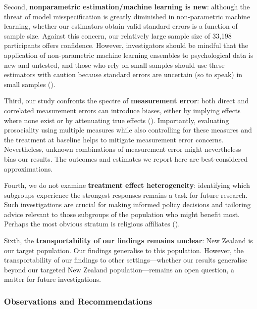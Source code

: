 \documentclass[
  single column]{article}
\begin{document}
Second, \textbf{nonparametric estimation/machine learning is new}:
although the threat of model misspecification is greatly diminished in
non-parametric machine learning, whether our estimators obtain valid
standard errors is a function of sample size. Against this concern, our
relatively large sample size of 33,198 participants offers confidence.
However, investigators should be mindful that the application of
non-parametric machine learning ensembles to psychological data is new
and untested, and those who rely on small samples should use these
estimators with caution because standard errors are uncertain (so to
speak) in small samples ().

Third, our study confronts the spectre of \textbf{measurement error}:
both direct and correlated measurement errors can introduce biases,
either by implying effects where none exist or by attenuating true
effects (). Importantly, evaluating prosociality using multiple
measures while also controlling for these measures and the treatment at
baseline helps to mitigate measurement error concerns. Nevertheless,
unknown combinations of measurement error might nevertheless bias our
results. The outcomes and estimates we report here are best-considered
approximations.

Fourth, we do not examine \textbf{treatment effect heterogeneity}:
identifying which subgroups experience the strongest responses remains a
task for future research. Such investigations are crucial for making
informed policy decisions and tailoring advice relevant to those
subgroups of the population who might benefit most. Perhaps the most
obvious stratum is religious affiliates
().

Sixth, the \textbf{transportability of our findings remains unclear}:
New Zealand is our target population. Our findings generalise to this
population. However, the transportability of our findings to other
settings---whether our results generalise beyond our targeted New
Zealand population---remains an open question, a matter for future
investigations.

\subsubsection{Observations and
Recommendations}\label{observations-and-recommendations}
\end{document}

